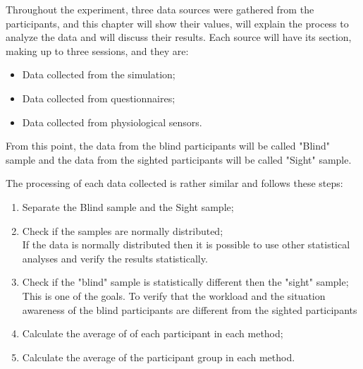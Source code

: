 


Throughout the experiment, three data sources were gathered from the participants, and this chapter will show their values, will explain the process to analyze the data and will discuss their results. Each source will have its section, making up to three sessions, and they are:

\begin{itemize}
    \item Data collected from the simulation;
    \item Data collected from questionnaires;
    \item Data collected from physiological sensors.
\end{itemize}

From this point, the data from the blind participants will be called "Blind" sample and the data from the sighted participants will be called "Sight" sample.

The processing of each data collected is rather similar and follows these steps:
\begin{enumerate}
    \item Separate the Blind sample and the Sight sample;
    \item Check if the samples are normally distributed; \label{itm:results_shapiro} \\
        If the data is normally distributed then it is possible to use other statistical analyses and verify the results statistically.
    \item Check if the "blind" sample is statistically different then the "sight" sample; \label{itm:results_t_test} \\ 
        This is one of the goals. To verify that the workload and the situation awareness of the blind participants are different from the sighted participants
    \item Calculate the average of of each participant in each method; \label{itm:results_average_method_particpant}
    \item Calculate the average of the participant group in each method. \label{itm:results_average_method}
\end{enumerate}

